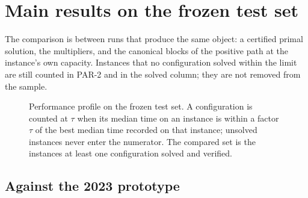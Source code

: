 \section{Main results on the frozen test set}
\label{sec:results}




The comparison is between runs that produce the same object: a certified primal
solution, the multipliers, and the canonical blocks of the positive path at
the instance's own capacity. Instances that no configuration solved within the
limit are still counted in PAR-2 and in the solved column; they are not removed
from the sample.

\begin{figure}[tbp]
  \centering
  \caption{Performance profile on the frozen test set. A configuration is
  counted at $\tau$ when its median time on an instance is within a factor
  $\tau$ of the best median time recorded on that instance; unsolved instances
  never enter the numerator. The compared set is the instances at least one
  configuration solved and verified.}
  \label{fig:profile-main}
\end{figure}

\subsection{Against the 2023 prototype}
\label{sec:legacy}

